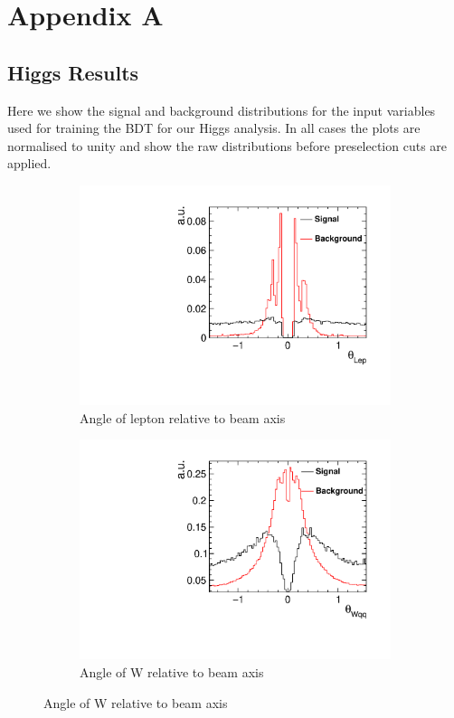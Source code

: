 \chapter{Appendix A}
\label{appendixA}

\section{Higgs Results}
Here we show the signal and background distributions for the input variables used for training the BDT for our Higgs analysis. In all cases the plots are normalised to unity and show the raw distributions before preselection cuts are applied.

\begin{figure}[ht] 
  \begin{subfigure}[b]{0.5\linewidth}
    \centering
    \includegraphics[width=0.75\linewidth]{Appendix/figures/DiraLep} 
    \caption{Angle of lepton relative to beam axis} 
    \vspace{4ex}
  \end{subfigure}%
  \begin{subfigure}[b]{0.5\linewidth}
    \centering
    \includegraphics[width=0.75\linewidth]{Appendix/figures/DiraWqq} 
    \caption{Angle of W relative to beam axis} 
    \vspace{4ex}
  \end{subfigure} 
\end{figure}

